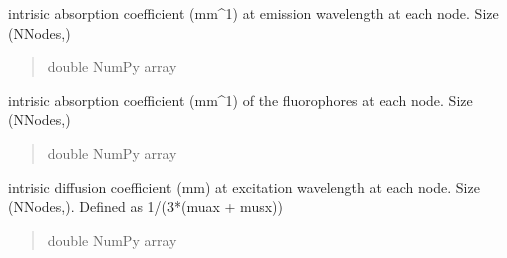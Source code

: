\documentclass[letterpaper,10pt,english]{sphinxmanual}
\begin{document}
\begin{fulllineitems}
\begin{fulllineitems}
\begin{quote}
\begin{description}
\end{description}\end{quote}

\end{fulllineitems}


\begin{fulllineitems}
\label{\detokenize{_autosummary/nirfasterff.base.fluor_mesh.fluormesh:nirfasterff.base.fluor_mesh.fluormesh.muam}}
\pysigstartsignatures
{}
\pysigstopsignatures
\sphinxAtStartPar
intrisic absorption coefficient (mm\textasciicircum{}\sphinxhyphen{}1) at emission wavelength at each node. Size (NNodes,)
\begin{quote}\begin{description}
\sphinxAtStartPar
double NumPy array

\end{description}\end{quote}

\end{fulllineitems}


\begin{fulllineitems}
\label{\detokenize{_autosummary/nirfasterff.base.fluor_mesh.fluormesh:nirfasterff.base.fluor_mesh.fluormesh.muaf}}
\pysigstartsignatures
{}
\pysigstopsignatures
\sphinxAtStartPar
intrisic absorption coefficient (mm\textasciicircum{}\sphinxhyphen{}1) of the fluorophores at each node. Size (NNodes,)
\begin{quote}\begin{description}
\sphinxAtStartPar
double NumPy array

\end{description}\end{quote}

\end{fulllineitems}


\begin{fulllineitems}
\label{\detokenize{_autosummary/nirfasterff.base.fluor_mesh.fluormesh:nirfasterff.base.fluor_mesh.fluormesh.kappax}}
\pysigstartsignatures
{}
\pysigstopsignatures
\sphinxAtStartPar
intrisic diffusion coefficient (mm) at excitation wavelength at each node. Size (NNodes,). Defined as 1/(3*(muax + musx))
\begin{quote}\begin{description}
\sphinxAtStartPar
double NumPy array


\end{description}
\end{quote}
\end{fulllineitems}
\end{fulllineitems}
\end{document}
